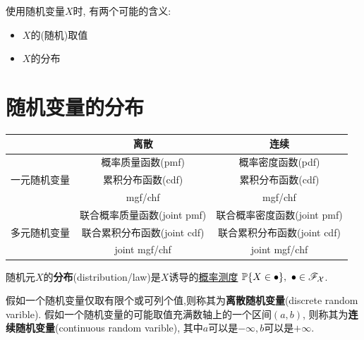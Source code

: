\begin{remark}
    使用随机变量$X$时, 有两个可能的含义:
    \begin{itemize}
        \item $X$的(随机)取值
        \item $X$的分布
    \end{itemize}
\end{remark}

\section{随机变量的分布}

\begin{table}[]
    \centering
    \begin{tabular}{|c|c|c|}
        \hline
                                      & 离散                        & 连续                        \\ \hline
        \multirow{3}{*}{一元随机变量} & 概率质量函数(pmf)           & 概率密度函数(pdf)           \\ \cline{2-3}
                                      & 累积分布函数(cdf)           & 累积分布函数(cdf)           \\ \cline{2-3}
                                      & mgf/chf                     & mgf/chf                     \\ \hline
        \multirow{3}{*}{多元随机变量} & 联合概率质量函数(joint pmf) & 联合概率密度函数(joint pmf) \\ \cline{2-3}
                                      & 联合累积分布函数(joint cdf) & 联合累积分布函数(joint cdf) \\ \cline{2-3}
                                      & joint mgf/chf               & joint mgf/chf               \\ \hline
    \end{tabular}
\end{table}

\begin{definition}
    随机元$X$的\textbf{分布}(distribution/law)是$X$诱导的\underline{概率测度}
    $\P\{X\in\bullet\},\ \bullet\in\mathscr{F}_{\mathcal{X}}$.
\end{definition}

\begin{definition}[离散与连续随机变量]
    假如一个随机变量仅取有限个或可列个值,则称其为\textbf{离散随机变量}(discrete random varible). 假如一个随机变量的可能取值充满数轴上的一个区间$ (a,b) $, 则称其为\textbf{连续随机变量}(continuous random varible), 其中$ a $可以是$ -\infty ,b $可以是$ +\infty $.
\end{definition}

